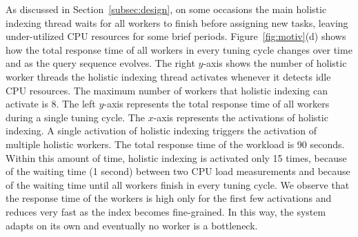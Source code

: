 As discussed in Section~\ref{subsec:design}, on some occasions 
the main holistic indexing thread waits for all workers to finish before assigning new tasks,
leaving under-utilized CPU resources for some brief periods. 
Figure~\ref{fig:motiv}(d) shows how the total response time 
of all workers in every tuning cycle changes over time and as the  query sequence evolves.
The right $y$-axis shows the number of holistic worker threads the holistic indexing thread activates whenever it detects idle CPU resources.
The maximum number of workers that holistic indexing can activate is 8. %
The left $y$-axis represents the total response time of all workers during a single tuning cycle. 
The $x$-axis represents the activations  of holistic indexing.
A single activation of holistic indexing triggers the activation of multiple holistic workers.
The total response time of the workload is 90 seconds.
Within this amount of time, holistic indexing is activated only 15 times, because of the waiting time (1 second) between two CPU load measurements and because of the waiting time until all workers finish in every tuning cycle.
We observe that the response time of the workers is high only for the first few activations and reduces very fast as the index becomes fine-grained. In this way, the system adapts on its own and eventually no worker is a bottleneck.


